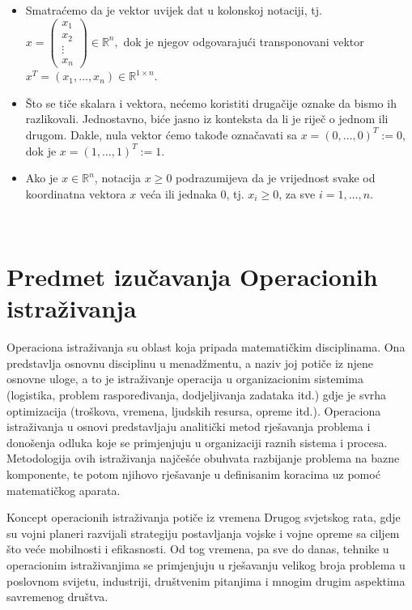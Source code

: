 \documentclass[b5paper, utf8, 11pt, colorlinks]{book}
\theoremstyle{definition}
\begin{document}
\begin{itemize}
	\item Smatraćemo da je vektor uvijek dat u kolonskoj notaciji, tj. 
	$x= \left (\begin{matrix}
		     x_1 \\
		     x_2 \\
		     \vdots\\
		     x_n
	\end{matrix} \right ) \in \mathbb{R}^n,$ dok je njegov odgovarajući transponovani vektor $x^T=(x_1,\ldots, x_n) \in \mathbb{R}^{1\times n}$. 
   \item Što se tiče skalara i vektora, nećemo koristiti drugačije oznake da bismo ih razlikovali. Jednostavno, biće jasno iz konteksta da li je riječ o jednom ili drugom. Dakle, nula vektor ćemo takođe označavati sa $x = (0, \ldots, 0)^T := 0$, dok je $x=(1,\ldots, 1)^T:=1$.  
   \item   Ako je $x \in \mathbb{R}^n$, notacija  $x \geq 0$ podrazumijeva da je vrijednost svake od koordinatna vektora $x$ veća ili jednaka 0, tj. $x_i \geq 0$, za sve $i=1,\ldots,n$. 
\end{itemize} 
\newpage \phantom{abc} \\ \newpage

\tableofcontents

 
\chapter{Predmet izučavanja Operacionih istraživanja}

Operaciona istraživanja su oblast koja pripada matematičkim disciplinama. Ona predstavlja osnovnu disciplinu u menadžmentu, a naziv joj potiče iz njene osnovne uloge, a to je istraživanje  operacija u organizacionim sistemima (logistika, problem raspoređivanja, dodjeljivanja zadataka itd.) gdje je svrha optimizacija (troškova, vremena, ljudskih resursa, opreme itd.). Operaciona istraživanja u osnovi predstavljaju analitički metod rješavanja problema i donošenja odluka koje se primjenjuju u organizaciji raznih sistema i procesa. Metodologija ovih istraživanja  najčešće obuhvata razbijanje problema na bazne komponente, te potom njihovo rješavanje u definisanim koracima uz pomoć matematičkog aparata. 


Koncept operacionih istraživanja potiče iz vremena Drugog svjetskog rata, gdje su vojni planeri razvijali strategiju postavljanja vojske i vojne opreme sa ciljem što veće mobilnosti i efikasnosti. Od tog vremena, pa sve do danas, tehnike u operacionim istraživanjima se primjenjuju u rješavanju velikog broja problema u poslovnom svijetu, industriji, društvenim pitanjima i mnogim drugim aspektima savremenog društva. 
\end{document}
